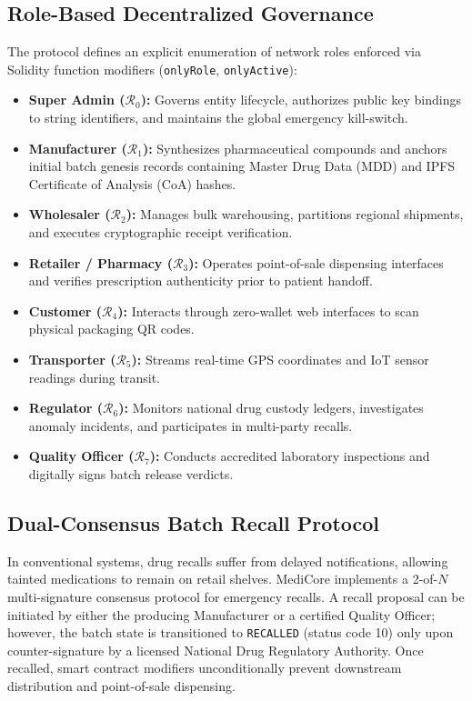 \documentclass[pdflatex,sn-mathphys-num]{sn-jnl}
\theoremstyle{thmstyleone}
\theoremstyle{thmstyletwo}
\theoremstyle{thmstylethree}
\begin{document}
\subsection{Role-Based Decentralized Governance}\label{sec3.1}
The protocol defines an explicit enumeration of network roles enforced via Solidity function modifiers (\texttt{onlyRole}, \texttt{onlyActive}):
\begin{itemize}
    \item \textbf{Super Admin ($\mathcal{R}_0$):} Governs entity lifecycle, authorizes public key bindings to string identifiers, and maintains the global emergency kill-switch.
    \item \textbf{Manufacturer ($\mathcal{R}_1$):} Synthesizes pharmaceutical compounds and anchors initial batch genesis records containing Master Drug Data (MDD) and IPFS Certificate of Analysis (CoA) hashes.
    \item \textbf{Wholesaler ($\mathcal{R}_2$):} Manages bulk warehousing, partitions regional shipments, and executes cryptographic receipt verification.
    \item \textbf{Retailer / Pharmacy ($\mathcal{R}_3$):} Operates point-of-sale dispensing interfaces and verifies prescription authenticity prior to patient handoff.
    \item \textbf{Customer ($\mathcal{R}_4$):} Interacts through zero-wallet web interfaces to scan physical packaging QR codes.
    \item \textbf{Transporter ($\mathcal{R}_5$):} Streams real-time GPS coordinates and IoT sensor readings during transit.
    \item \textbf{Regulator ($\mathcal{R}_6$):} Monitors national drug custody ledgers, investigates anomaly incidents, and participates in multi-party recalls.
    \item \textbf{Quality Officer ($\mathcal{R}_7$):} Conducts accredited laboratory inspections and digitally signs batch release verdicts.
\end{itemize}

\subsection{Dual-Consensus Batch Recall Protocol}\label{sec3.2}
In conventional systems, drug recalls suffer from delayed notifications, allowing tainted medications to remain on retail shelves. MediCore implements a 2-of-$N$ multi-signature consensus protocol for emergency recalls. A recall proposal can be initiated by either the producing Manufacturer or a certified Quality Officer; however, the batch state is transitioned to \texttt{RECALLED} (status code 10) only upon counter-signature by a licensed National Drug Regulatory Authority. Once recalled, smart contract modifiers unconditionally prevent downstream distribution and point-of-sale dispensing.
\end{document}
